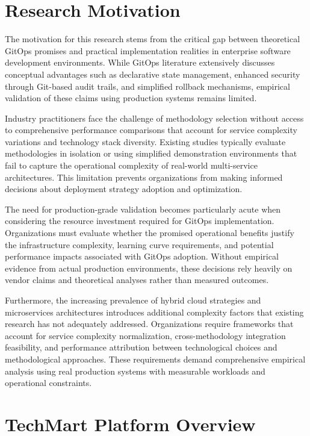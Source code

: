 \section{Research Motivation}

The motivation for this research stems from the critical gap between theoretical GitOps promises and practical implementation realities in enterprise software development environments. While GitOps literature extensively discusses conceptual advantages such as declarative state management, enhanced security through Git-based audit trails, and simplified rollback mechanisms, empirical validation of these claims using production systems remains limited.

Industry practitioners face the challenge of methodology selection without access to comprehensive performance comparisons that account for service complexity variations and technology stack diversity. Existing studies typically evaluate methodologies in isolation or using simplified demonstration environments that fail to capture the operational complexity of real-world multi-service architectures. This limitation prevents organizations from making informed decisions about deployment strategy adoption and optimization.

The need for production-grade validation becomes particularly acute when considering the resource investment required for GitOps implementation. Organizations must evaluate whether the promised operational benefits justify the infrastructure complexity, learning curve requirements, and potential performance impacts associated with GitOps adoption. Without empirical evidence from actual production environments, these decisions rely heavily on vendor claims and theoretical analyses rather than measured outcomes.

Furthermore, the increasing prevalence of hybrid cloud strategies and microservices architectures introduces additional complexity factors that existing research has not adequately addressed. Organizations require frameworks that account for service complexity normalization, cross-methodology integration feasibility, and performance attribution between technological choices and methodological approaches. These requirements demand comprehensive empirical analysis using real production systems with measurable workloads and operational constraints.

\section{TechMart Platform Overview}

